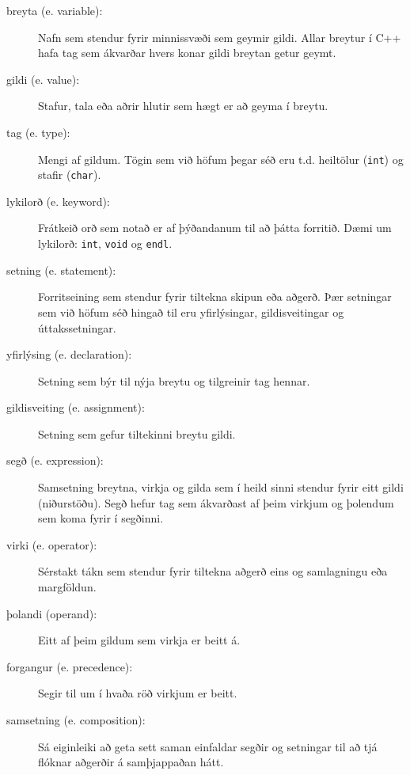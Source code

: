 \begin{description}

\item[breyta (e. variable):] Nafn sem stendur fyrir minnissvæði sem geymir gildi. 
Allar breytur í C++ hafa tag sem ákvarðar hvers konar gildi breytan getur geymt. 

\item[gildi (e. value):] Stafur, tala eða aðrir hlutir sem hægt er að geyma í breytu.

\item[tag (e. type):] Mengi af gildum. Tögin sem við höfum þegar séð eru t.d. heiltölur ({\tt int}) og stafir ({\tt char}).

\item[lykilorð (e. keyword):]  Frátkeið orð sem notað er af þýðandanum til að þátta forritið.
Dæmi um lykilorð: {\tt int}, {\tt void} og {\tt endl}.

\item[setning (e. statement):] Forritseining sem stendur fyrir tiltekna skipun eða aðgerð.
Þær setningar sem við höfum séð hingað til eru yfirlýsingar, gildisveitingar og úttakssetningar.

\item[yfirlýsing (e. declaration):] Setning sem býr til nýja breytu og tilgreinir tag hennar.

\item[gildisveiting (e. assignment):] Setning sem gefur tiltekinni breytu gildi.

\item[segð (e. expression):] Samsetning breytna, virkja og gilda sem í heild sinni stendur fyrir eitt gildi (niðurstöðu).
Segð hefur tag sem ákvarðast af þeim virkjum og þolendum sem koma fyrir í segðinni. 

\item[virki (e. operator):] Sérstakt tákn sem stendur fyrir tiltekna aðgerð eins og samlagningu eða margföldun.

\item[þolandi (operand):] Eitt af þeim gildum sem virkja er beitt á. 

\item[forgangur (e. precedence):] Segir til um í hvaða röð virkjum er beitt. 

\item[samsetning (e. composition):] Sá eiginleiki að geta sett saman einfaldar segðir og setningar til að tjá flóknar aðgerðir á samþjappaðan hátt.


\end{description}

